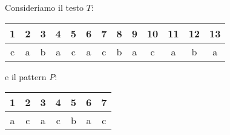 \begin{esempio}
    Consideriamo il testo $T$:
    \begin{table}[!ht]
        \centering
        \begin{tabular}{ccccccccccccc}
            1                       & 2                      & 3                      & 4                      & 5                      & 6                      & 7                      & 8                      & 9                      & 10                     & 11                     & 12                     & 13                     \\ \hline
            \multicolumn{1}{|c|}{c} & \multicolumn{1}{c|}{a} & \multicolumn{1}{c|}{b} & \multicolumn{1}{c|}{a} & \multicolumn{1}{c|}{c} & \multicolumn{1}{c|}{a} & \multicolumn{1}{c|}{c} & \multicolumn{1}{c|}{b} & \multicolumn{1}{c|}{a} & \multicolumn{1}{c|}{c} & \multicolumn{1}{c|}{a} & \multicolumn{1}{c|}{b} & \multicolumn{1}{c|}{a} \\ \hline
        \end{tabular}
    \end{table}

    e il pattern $P$:
    \begin{table}[!ht]
        \centering
        \begin{tabular}{ccccccc}
            1                       & 2                      & 3                      & 4                      & 5                      & 6                      & 7                      \\ \hline
            \multicolumn{1}{|c|}{a} & \multicolumn{1}{c|}{c} & \multicolumn{1}{c|}{a} & \multicolumn{1}{c|}{c} & \multicolumn{1}{c|}{b} & \multicolumn{1}{c|}{a} & \multicolumn{1}{c|}{c} \\ \hline
        \end{tabular}
    \end{table}


\end{esempio}
